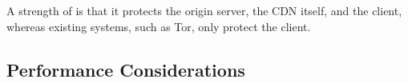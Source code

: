 

A strength of \system{} is that it protects the origin server, the CDN itself, and the client, whereas 
existing systems, such as Tor, only protect the client.

\subsection{Performance Considerations}
